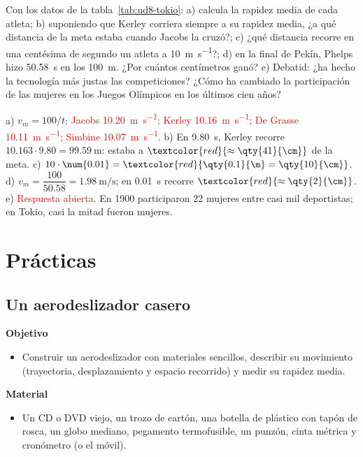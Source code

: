 \begin{exercise}
    Con los datos de la tabla~\ref{tab:ud8-tokio}: a) calcula la rapidez media de cada atleta; b) suponiendo que Kerley corriera
    siempre a su rapidez media, ¿a qué distancia de la meta estaba cuando Jacobs la cruzó?; c) ¿qué distancia recorre en una
    centésima de segundo un atleta a \qty{10}{\m\per\s}?; d) en la final de Pekín, Phelps hizo \qty{50.58}{\s} en los
    \qty{100}{\m}. ¿Por cuántos centímetros ganó? e) Debatid: ¿ha hecho la tecnología más justas las competiciones? ¿Cómo ha
    cambiado la participación de las mujeres en los Juegos Olímpicos en los últimos cien años?
    \begin{solu}
        a) \(v_m = 100/t\): \textcolor{red}{Jacobs \qty{10.20}{\m\per\s}; Kerley \qty{10.16}{\m\per\s}; De Grasse
        \qty{10.11}{\m\per\s}; Simbine \qty{10.07}{\m\per\s}}. b) En \qty{9.80}{\s}, Kerley recorre
        \(\num{10.163} \cdot \num{9.80} = \qty{99.59}{\m}\): estaba a \(\textcolor{red}{\approx \qty{41}{\cm}}\) de la meta.
        c) \(10 \cdot \num{0.01} = \textcolor{red}{\qty{0.1}{\m} = \qty{10}{\cm}}\). d) \(v_m = \dfrac{100}{\num{50.58}} =
        \qty{1.98}{\m\per\s}\); en \qty{0.01}{\s} recorre \(\textcolor{red}{\approx \qty{2}{\cm}}\). e) \textcolor{red}{Respuesta
        abierta}. En 1900 participaron 22 mujeres entre casi mil deportistas; en Tokio, casi la mitad fueron mujeres.
    \end{solu}
\end{exercise}

\section{Prácticas}\label{sec:ud8-practicas}

\subsection{Un aerodeslizador casero}

\noindent\begin{minipage}[t]{0.48\textwidth}
    \textbf{Objetivo}
    \begin{itemize}
        \item Construir un aerodeslizador con materiales sencillos, describir su movimiento (trayectoria, desplazamiento y espacio
        recorrido) y medir su rapidez media.
    \end{itemize}
\end{minipage}\hfill
\begin{minipage}[t]{0.48\textwidth}
    \textbf{Material}
    \begin{itemize}
        \item Un CD o DVD viejo, un trozo de cartón, una botella de plástico con tapón de rosca, un globo mediano, pegamento
        termofusible, un punzón, cinta métrica y cronómetro (o el móvil).
    \end{itemize}
\end{minipage}

